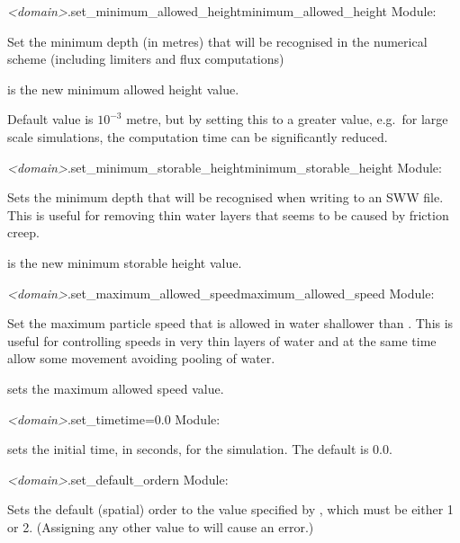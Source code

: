 \documentclass{manual}
\begin{document}
\begin{methoddesc}{\emph{<domain>}.set_minimum_allowed_height}{minimum_allowed_height}
Module: 

Set the minimum depth (in metres) that will be recognised in
the numerical scheme (including limiters and flux computations)

 is the new minimum allowed height value.

Default value is $10^{-3}$ metre, but by setting this to a greater value,
e.g.\ for large scale simulations, the computation time can be
significantly reduced.
\end{methoddesc}

\begin{methoddesc}{\emph{<domain>}.set_minimum_storable_height}{minimum_storable_height}
Module: 

Sets the minimum depth that will be recognised when writing
to an SWW file. This is useful for removing thin water layers
that seems to be caused by friction creep.

 is the new minimum storable height value.
\end{methoddesc}

\begin{methoddesc}{\emph{<domain>}.set_maximum_allowed_speed}{maximum_allowed_speed}
Module: 

Set the maximum particle speed that is allowed in water
shallower than . This is useful for
controlling speeds in very thin layers of water and at the same time
allow some movement avoiding pooling of water.

 sets the maximum allowed speed value.
\end{methoddesc}

\begin{methoddesc}{\emph{<domain>}.set_time}{time=0.0}
Module: 

 sets the initial time, in seconds, for the simulation. The
default is 0.0.
\end{methoddesc}

\begin{methoddesc}{\emph{<domain>}.set_default_order}{n}
Module: 

Sets the default (spatial) order to the value specified by
, which must be either 1 or 2. (Assigning any other value
to  will cause an error.)
\end{methoddesc}
\end{document}
